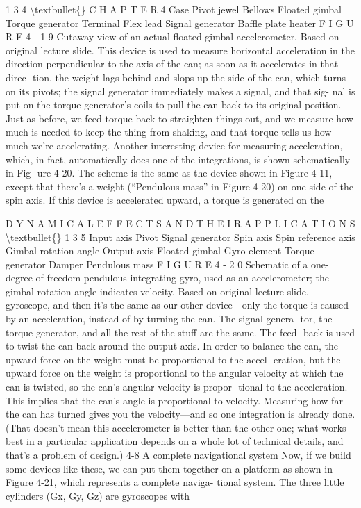 \documentclass[10pt,oneside]{article}
\begin{document}
1 3 4 \textbackslash{}textbullet\{\} C H A P T E R  4 Case Pivot jewel Bellows Floated gimbal Torque generator Terminal Flex lead Signal generator Baffle plate heater F I G U R E  4 - 1 9 Cutaway view of an actual floated gimbal accelerometer. Based on original lecture slide. This device is used to measure horizontal acceleration in the direction perpendicular to the axis of the can; as soon as it accelerates in that direc- tion, the weight lags behind and slops up the side of the can, which turns on its pivots; the signal generator immediately makes a signal, and that sig- nal is put on the torque generator’s coils to pull the can back to its original position. Just as before, we feed torque back to straighten things out, and we measure how much is needed to keep the thing from shaking, and that torque tells us how much we’re accelerating. Another interesting device for measuring acceleration, which, in fact, automatically does one of the integrations, is shown schematically in Fig- ure 4-20. The scheme is the same as the device shown in Figure 4-11, except that there’s a weight (“Pendulous mass” in Figure 4-20) on one side of the spin axis. If this device is accelerated upward, a torque is generated on the\par

D Y N A M I C A L  E F F E C T S  A N D  T H E I R  A P P L I C A T I O N S \textbackslash{}textbullet\{\} 1 3 5 Input axis Pivot Signal generator Spin axis Spin reference axis Gimbal rotation angle Output axis Floated gimbal Gyro element Torque generator Damper Pendulous mass F I G U R E  4 - 2 0 Schematic of a one-degree-of-freedom pendulous integrating gyro, used as an accelerometer; the gimbal rotation angle indicates velocity. Based on original lecture slide. gyroscope, and then it’s the same as our other device---only the torque is caused by an acceleration, instead of by turning the can. The signal genera- tor, the torque generator, and all the rest of the stuff are the same. The feed- back is used to twist the can back around the output axis. In order to balance the can, the upward force on the weight must be proportional to the accel- eration, but the upward force on the weight is proportional to the angular velocity at which the can is twisted, so the can’s angular velocity is propor- tional to the acceleration. This implies that the can’s angle is proportional to velocity. Measuring how far the can has turned gives you the velocity---and so one integration is already done. (That doesn’t mean this accelerometer is better than the other one; what works best in a particular application depends on a whole lot of technical details, and that’s a problem of design.) 4-8 A complete navigational system Now, if we build some devices like these, we can put them together on a platform as shown in Figure 4-21, which represents a complete naviga- tional system. The three little cylinders (Gx, Gy, Gz) are gyroscopes with\par
\end{document}
